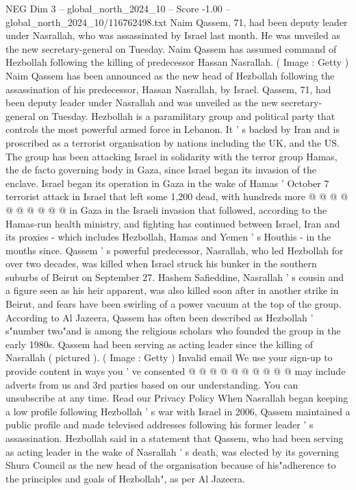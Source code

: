 \begin{textsample}{NEG Dim 3 – global\_north\_2024\_10 – Score -1.00 – global\_north\_2024\_10/116762498.txt}  \label{ex:f3_neg_337}
Naim Qassem, 71, had been deputy leader under Nasrallah, who was assassinated by Israel last month.
He was unveiled as the new secretary-general on Tuesday.
Naim Qassem has assumed command of Hezbollah following the killing of predecessor Hassan Nasrallah. ( Image : Getty ) Naim Qassem has been announced as the new head of Hezbollah following the assassination of his predecessor, Hassan Nasrallah, by Israel.
Qassem, 71, had been deputy leader under Nasrallah and was unveiled as the new secretary-general on Tuesday.
Hezbollah is a paramilitary group and political party that controls the most powerful armed force in Lebanon.
It ' s backed by Iran and is proscribed as a terrorist organisation by nations including the UK, and the US.
The group has been attacking Israel in solidarity with the terror group Hamas, the de facto governing body in Gaza, since Israel began its invasion of the enclave.
Israel began its operation in Gaza in the wake of Hamas ' October 7 terrorist attack in Israel that left some 1,200 dead, with hundreds more @ @ @ @ @ @ @ @ @ @ in Gaza in the Israeli invasion that followed, according to the Hamas-run health ministry, and fighting has continued between Israel, Iran and its proxies - which includes Hezbollah, Hamas and Yemen ' s Houthis - in the months since.
Qassem ' s powerful predecessor, Nasrallah, who led Hezbollah for over two decades, was killed when Israel struck his bunker in the southern suburbs of Beirut on September 27.
Hashem Safieddine, Nasrallah ' s cousin and a figure seen as his heir apparent, was also killed soon after in another strike in Beirut, and fears have been swirling of a power vacuum at the top of the group.
According to Al Jazeera, Qassem has often been described as Hezbollah ' s"number two"and is among the religious scholars who founded the group in the early 1980s.
Qassem had been serving as acting leader since the killing of Nasrallah ( pictured ). ( Image : Getty ) Invalid email We use your sign-up to provide content in ways you ' ve consented @ @ @ @ @ @ @ @ @ @ may include adverts from us and 3rd parties based on our understanding.
You can unsubscribe at any time.
Read our Privacy Policy When Nasrallah began keeping a low profile following Hezbollah ' s war with Israel in 2006, Qassem maintained a public profile and made televised addresses following his former leader ' s assassination.
Hezbollah said in a statement that Qassem, who had been serving as acting leader in the wake of Nasrallah ' s death, was elected by its governing Shura Council as the new head of the organisation because of his"adherence to the principles and goals of Hezbollah", as per Al Jazeera.

\end{textsample}
